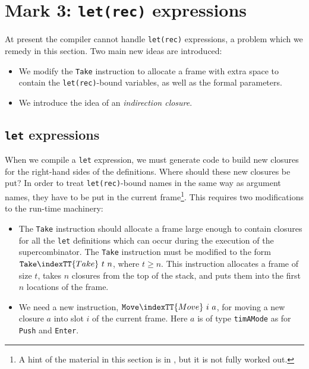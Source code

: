 \section{Mark 3: \mbox{\tt let(rec)} expressions}

At present the compiler cannot handle
\mbox{\tt let(rec)} expressions,
a problem which
we remedy in this section.  Two main new ideas are introduced:
\begin{itemize}
\item
We modify the \mbox{\tt Take} instruction to allocate a frame with extra space
to contain
the \mbox{\tt let(rec)}-bound variables, as well as the formal parameters.
\item
We introduce the idea of an {\em indirection closure}.
\end{itemize}

\subsection{\mbox{\tt let} expressions}

When we compile a \mbox{\tt let} expression, we must generate code
to build new closures for the right-hand sides of the
definitions.
Where should these new closures be put?
In order to treat \mbox{\tt let(rec)}-bound names in the same way as argument
names, they have to be put in the current frame\footnote{%
A hint of the material in this section is in \cite{WD89}, but it
is not fully worked out.}.
This requires two modifications to the run-time machinery:
\begin{itemize}
\item
The \mbox{\tt Take} instruction should allocate a frame large enough to contain
closures for all the \mbox{\tt let} definitions which can occur during the
execution of the supercombinator.
The \mbox{\tt Take} instruction must be modified to the form $\mbox{\tt Take}\indexTT{Take}~t~n$, where
$t\geq n$.
This instruction allocates a frame of size $t$, takes $n$ closures from the
top of the stack,
and puts them into the first $n$ locations of the frame.
\item
We need a new instruction, $\mbox{\tt Move}\indexTT{Move}~i~a$,  for moving a new closure
$a$ into slot $i$ of the current frame.
Here $a$ is of type \mbox{\tt timAMode} as for \mbox{\tt Push} and \mbox{\tt Enter}.
\end{itemize}

